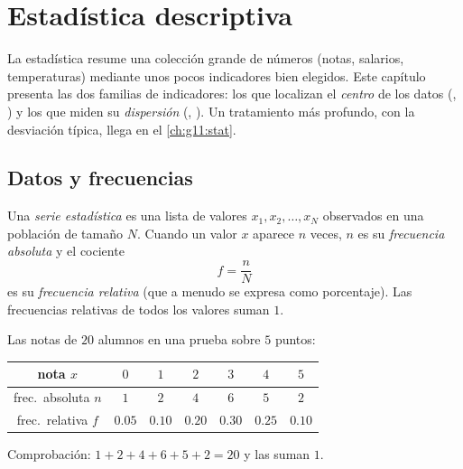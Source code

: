 \chapter{Estadística descriptiva}\label{ch:g10:stats}

La estadística resume una colección grande de números (notas, salarios,
temperaturas) mediante unos pocos indicadores bien elegidos. Este capítulo
presenta las dos familias de indicadores: los que localizan el
\emph{centro} de los datos (, ) y los que miden su
\emph{dispersión} (, ). Un tratamiento más profundo, con
la desviación típica, llega en el \cref{ch:g11:stat}.

\section{Datos y frecuencias}

\begin{definition}\label{def:g10:stats:series}
Una \emph{serie estadística} es una lista de
valores $x_1, x_2, \dots, x_N$ observados en una población de tamaño $N$.
Cuando un valor $x$ aparece $n$ veces, $n$ es su \emph{frecuencia
absoluta} y el cociente
\[
f = \frac{n}{N}
\]
es su \emph{frecuencia relativa} (que a menudo
se expresa como porcentaje). Las frecuencias relativas de todos los
valores suman $1$.
\end{definition}

\begin{example}\label{ex:g10:stats:frequencies}
Las notas de $20$ alumnos en una prueba sobre $5$ puntos:
\begin{center}
\renewcommand{\arraystretch}{1.2}
\begin{tabular}{c|cccccc}
nota $x$ & $0$ & $1$ & $2$ & $3$ & $4$ & $5$ \\
\hline
frec.\ absoluta $n$ & $1$ & $2$ & $4$ & $6$ & $5$ & $2$ \\
frec.\ relativa $f$ & $0.05$ & $0.10$ & $0.20$ & $0.30$ & $0.25$ & $0.10$ \\
\end{tabular}
\end{center}
Comprobación: $1 + 2 + 4 + 6 + 5 + 2 = 20$ y las 
suman $1$.
\end{example}

